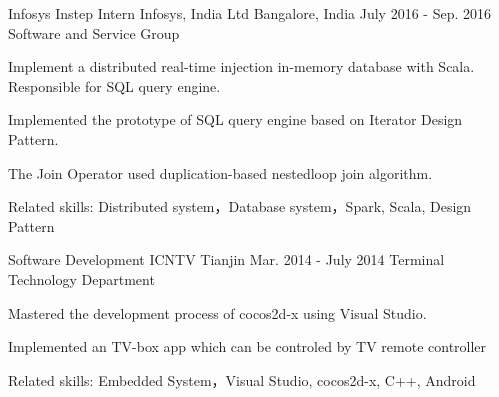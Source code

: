 \begin{cventries}
  \cventry
    {Infosys Instep Intern}
    {Infosys, India Ltd}
    {Bangalore, India}
    {July 2016 - Sep. 2016}
    {Software and Service Group}
    {
      \begin{cvitems}
        \item {Implement a distributed real-time injection in-memory database with Scala. Responsible for SQL query engine.}
        \item {Implemented the prototype of SQL query engine based on Iterator Design Pattern.}
        \item {The Join Operator used duplication-based nestedloop join algorithm.}
        \item {Related skills: Distributed system，Database system，Spark, Scala, Design Pattern}
      \end{cvitems}
    }
  \cventry
    {Software Development}
    {ICNTV}
    {Tianjin}
    {Mar. 2014 - July 2014}
    {Terminal Technology Department}
    {
      \begin{cvitems}
        \item {Mastered the development process of cocos2d-x using Visual Studio.}
        \item {Implemented an TV-box app which can be controled by TV remote controller}
        \item {Related skills: Embedded System，Visual Studio, cocos2d-x, C++, Android}
      \end{cvitems} 
    }
\end{cventries}

